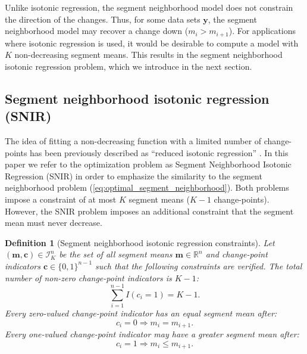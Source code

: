 \documentclass{article}
\newtheorem{definition}{Definition}
\newcommand{\RR}{\mathbb R}
\begin{document}
Unlike isotonic regression, the segment neighborhood model
does not constrain the direction of the changes. Thus, for some
data sets $\mathbf y$, the segment neighborhood model may
recover a change down ($m_i > m_{i+1}$). For applications where
isotonic regression is used, it would be desirable to compute a model
with $K$ non-decreasing segment means. This results in the segment neighborhood
isotonic regression problem, which we introduce in the next section.

\subsection{Segment neighborhood isotonic regression (SNIR)}

The idea of fitting a non-decreasing function with a limited number of
change-points has been previously described as ``reduced isotonic
regression'' \citep{reduced-monotonic-regression,
  hardwick2014optimal}. In this paper we refer to the optimization
problem as Segment Neighborhood Isotonic Regression (SNIR) in order to
emphasize the similarity to the segment neighborhood problem
(\ref{eq:optimal_segment_neighborhood}). Both problems impose a
constraint of at most $K$ segment means ($K-1$
change-points). However, the SNIR problem imposes an additional
constraint that the segment mean must never decrease.

\begin{definition}[Segment neighborhood isotonic regression constraints]
  \label{def:I}
  Let $(\mathbf m, \mathbf c)\in\mathcal I_K^n$ be the set of all segment means
  $\mathbf m\in\RR^n$ and change-point indicators
  $\mathbf c\in\{0,1\}^{n-1}$ such that the following constraints are
  verified. The total number of non-zero change-point indicators is $K-1$:
  \begin{equation}
    \label{eq:isotonic_segments}
    \sum_{i=1}^{n-1} I(c_i = 1) = K-1.
  \end{equation}
  Every zero-valued change-point indicator has an equal segment mean
  after:
  \begin{equation}
    \label{eq:isotonic_0}
    c_i = 0 \Rightarrow m_i = m_{i+1}.
  \end{equation}
  Every one-valued change-point indicator may have a greater segment
  mean after:
  \begin{equation}
    \label{eq:isotonic_1}
    c_i = 1 \Rightarrow m_i \leq m_{i+1}.
  \end{equation}
\end{definition}
\end{document}
